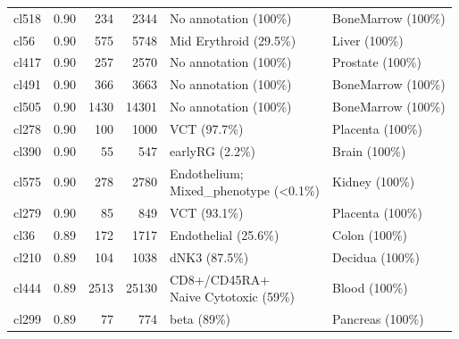 \begin{table}[ht!]
\begin{tabular}{lrrrll}
  cl518 & 0.90 & 234 & 2344 & No annotation (100\%) & BoneMarrow (100\%) \\ 
  cl56 & 0.90 & 575 & 5748 & Mid Erythroid (29.5\%) & Liver (100\%) \\ 
  cl417 & 0.90 & 257 & 2570 & No annotation (100\%) & Prostate (100\%) \\ 
  cl491 & 0.90 & 366 & 3663 & No annotation (100\%) & BoneMarrow (100\%) \\ 
  cl505 & 0.90 & 1430 & 14301 & No annotation (100\%) & BoneMarrow (100\%) \\ 
  cl278 & 0.90 & 100 & 1000 & VCT (97.7\%) & Placenta (100\%) \\ 
  cl390 & 0.90 &  55 & 547 & earlyRG (2.2\%) & Brain (100\%) \\ 
  cl575 & 0.90 & 278 & 2780 & \specialcell[t]{Endothelium;\\Mixed\_phenotype (<0.1\%)} & Kidney (100\%) \\ 
  cl279 & 0.90 &  85 & 849 & VCT (93.1\%) & Placenta (100\%) \\ 
  cl36 & 0.89 & 172 & 1717 & Endothelial (25.6\%) & Colon (100\%) \\ 
  cl210 & 0.89 & 104 & 1038 & dNK3 (87.5\%) & Decidua (100\%) \\ 
  cl444 & 0.89 & 2513 & 25130 & \specialcell[t]{CD8+/CD45RA+\\Naive Cytotoxic (59\%)} & Blood (100\%) \\ 
  cl299 & 0.89 &  77 & 774 & beta (89\%) & Pancreas (100\%) \\ 
   \bottomrule
\end{tabular}
\end{table}  
  
